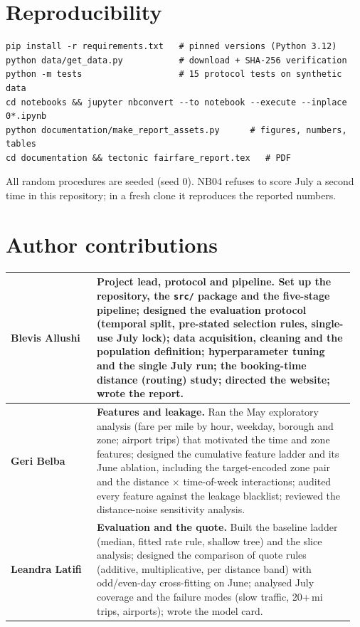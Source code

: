 \documentclass[11pt,a4paper]{article}
\newcommand{\code}[1]{\texttt{#1}}
\begin{document}
\section*{Reproducibility}
\begin{verbatim}
pip install -r requirements.txt   # pinned versions (Python 3.12)
python data/get_data.py           # download + SHA-256 verification
python -m tests                   # 15 protocol tests on synthetic data
cd notebooks && jupyter nbconvert --to notebook --execute --inplace 0*.ipynb
python documentation/make_report_assets.py      # figures, numbers, tables
cd documentation && tectonic fairfare_report.tex   # PDF
\end{verbatim}
All random procedures are seeded (seed 0). NB04 refuses to score July a second time in this repository; in a fresh clone it reproduces the reported numbers.

\section*{Author contributions}
\begin{tabular}{@{}p{0.24\linewidth}p{0.72\linewidth}@{}}
\toprule
\textbf{Blevis Allushi} & \textbf{Project lead, protocol and pipeline.} Set up the repository, the \code{src/} package and the five-stage pipeline; designed the evaluation protocol (temporal split, pre-stated selection rules, single-use July lock); data acquisition, cleaning and the population definition; hyperparameter tuning and the single July run; the booking-time distance (routing) study; directed the website; wrote the report. \\
\midrule
\textbf{Geri Belba} & \textbf{Features and leakage.} Ran the May exploratory analysis (fare per mile by hour, weekday, borough and zone; airport trips) that motivated the time and zone features; designed the cumulative feature ladder and its June ablation, including the target-encoded zone pair and the distance $\times$ time-of-week interactions; audited every feature against the leakage blacklist; reviewed the distance-noise sensitivity analysis. \\
\midrule
\textbf{Leandra Latifi} & \textbf{Evaluation and the quote.} Built the baseline ladder (median, fitted rate rule, shallow tree) and the slice analysis; designed the comparison of quote rules (additive, multiplicative, per distance band) with odd/even-day cross-fitting on June; analysed July coverage and the failure modes (slow traffic, 20+\,mi trips, airports); wrote the model card. \\
\bottomrule
\end{tabular}
\end{document}
